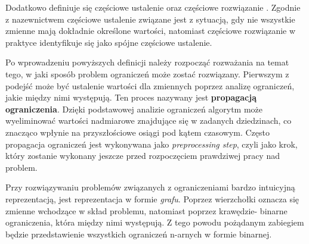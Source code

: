     Dodatkowo definiuje się częściowe ustalenie oraz częściowe rozwiązanie \cite{AI}. Zgodnie \\
    z nazewnictwem 
    częściowe ustalenie związane jest z sytuacją, gdy nie wszystkie zmienne mają dokładnie określone wartości, natomiast 
    częściowe rozwiązanie w praktyce identyfikuje się jako spójne częściowe ustalenie.

    Po wprowadzeniu powyższych definicji należy rozpocząć rozważania na temat tego, w jaki sposób 
    problem ograniczeń może zostać rozwiązany. Pierwszym z podejść może być ustalenie wartości dla zmiennych poprzez 
    analizę ograniczeń, jakie między nimi występują. Ten proces nazywany jest \textbf{propagacją ograniczenia}. Dzięki 
    podstawowej analizie ograniczeń algorytm może wyeliminować wartości nadmiarowe znajdujące się w zadanych dziedzinach, co znacząco wpłynie 
    na przyszłościowe osiągi pod kątem czasowym. Często propagacja ograniczeń jest wykonywana jako \textit{preprocessing step}, czyli 
    jako krok, który zostanie wykonany jeszcze przed rozpoczęciem prawdziwej pracy nad problem. 
    
    Przy rozwiązywaniu problemów związanych z ograniczeniami bardzo intuicyjną reprezentacją, jest reprezentacja 
    w formie \textit{grafu}. Poprzez wierzchołki oznacza się zmienne wchodzące w skład problemu, natomiast poprzez krawędzie- 
    binarne ograniczenia, która między nimi występują. Z tego powodu pożądanym zabiegiem będzie przedstawienie wszystkich ograniczeń 
    n-arnych w formie binarnej.

